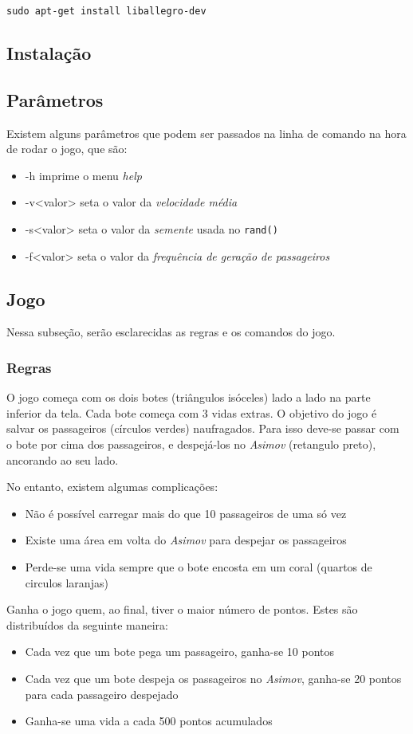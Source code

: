 \documentclass[12pt,a4paper]{article}
\begin{document}
\verb|sudo apt-get install liballegro-dev|

\subsection{Instalação}
\subsection{Parâmetros}
Existem alguns parâmetros que podem ser passados na linha de comando na hora de rodar o jogo, que são:
\begin{itemize}
\item -h        imprime o menu \emph{help}
\item -v<valor> seta o valor da \emph{velocidade média}
\item -s<valor> seta o valor da \emph{semente} usada no \verb|rand()|
\item -f<valor> seta o valor da \emph{frequência de geração de passageiros}
\end{itemize}

\subsection{Jogo}
Nessa subseção, serão esclarecidas as regras e os comandos do jogo.

\subsubsection{Regras}
O jogo começa com os dois botes (triângulos isóceles) lado a lado na parte inferior da tela.
Cada bote começa com 3 vidas extras.
O objetivo do jogo é salvar os passageiros (círculos verdes) naufragados. Para isso deve-se passar com o bote por cima dos passageiros, e despejá-los no \emph{Asimov} (retangulo preto), ancorando ao seu lado.

No entanto, existem algumas complicações:
\begin{itemize}
\item Não é possível carregar mais do que 10 passageiros de uma só vez
\item Existe uma área em volta do \emph{Asimov} para despejar os passageiros
\item Perde-se uma vida sempre que o bote encosta em um coral (quartos de circulos laranjas) 
\end{itemize}

Ganha o jogo quem, ao final, tiver o maior número de pontos.
Estes são distribuídos da seguinte maneira:
\begin{itemize}
\item Cada vez que um bote pega um passageiro, ganha-se 10 pontos
\item Cada vez que um bote despeja os passageiros no \emph{Asimov}, ganha-se 20 pontos para cada passageiro despejado
\item Ganha-se uma vida a cada 500 pontos acumulados
\end{itemize}
\end{document}
